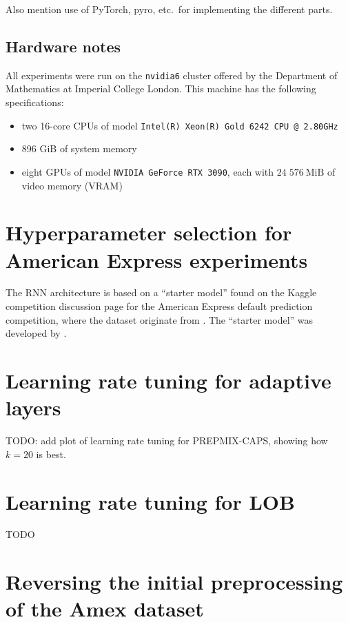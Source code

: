 \documentclass{statsmsc}
\begin{document}
{Also mention use of PyTorch, pyro, etc.\ for implementing the different parts.

\section{Hardware notes}%
\label{sec:Hardware notes}

All experiments were run on the \texttt{nvidia6} cluster offered by the Department of Mathematics
at Imperial College London. This machine has the following specifications:
\begin{itemize}
    \item two 16-core CPUs of model \texttt{Intel(R) Xeon(R) Gold 6242 CPU @ 2.80GHz}
    \item 896 GiB of system memory
    \item eight GPUs of model \texttt{NVIDIA GeForce RTX 3090}, each with
        $24\;576~\textrm{MiB}$ of video memory (VRAM)

\end{itemize}

\chapter{Hyperparameter selection for American Express experiments}
\label{ch:hyp_amex}

The \ac{RNN} architecture is based on a ``starter model'' found on the Kaggle competition
discussion page for the American Express default prediction competition, where the dataset
originate from \cite{amex-data}. The ``starter model'' was developed by \cite{amex-starter}.

\chapter{Learning rate tuning for adaptive layers}
\label{ch:lr_tuning}

TODO: add plot of learning rate tuning for \ac{PREPMIX-CAPS}, showing how $k=20$ is best.

\chapter{Learning rate tuning for LOB}
\label{ch:hyp_lob}

TODO

\chapter{Reversing the initial preprocessing of the Amex dataset}%
\label{ch:undo_amex_pre}

}
\end{document}

